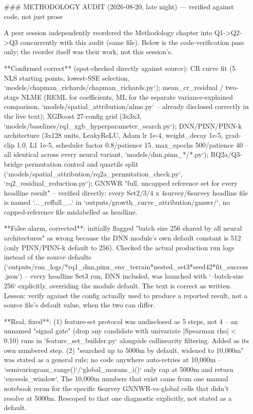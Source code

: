 ### METHODOLOGY AUDIT (2026-08-20, late night) — verified against code, not just prose

A peer session independently reordered the Methodology chapter into Q1->Q2->Q3 concurrently
with this audit (same file). Below is the code-verification pass only; the reorder itself was
their work, not this session's.

**Confirmed correct** (spot-checked directly against source): CR curve fit (5 NLS starting
points, lowest-SSE selection, `models/chapman_richards/chapman_richards.py`); mean_cr_residual /
two-stage NLME (REML for coefficients, ML for the separate variance-explained comparison,
`models/spatial_attribution/nlme.py` -- already disclosed correctly in the live text); XGBoost
27-config grid (3x3x3, `models/baselines/rq1_xgb_hyperparameter_search.py`); DNN/PINN/PINN-k
architecture (3x128 units, LeakyReLU, Adam lr 1e-4, weight_decay 1e-5, grad-clip 1.0, L1 1e-5,
scheduler factor 0.8/patience 15, max_epochs 500/patience 40 -- all identical across every neural
variant, `models/{dnn,pinn}_*/*.py`); RQ2a/Q3-bridge permutation control and quartile split
(`models/spatial_attribution/rq2a_permutation_check.py`, `rq2_residual_reduction.py`); GNNWR
"full, uncapped reference set for every headline result" -- verified directly: every Set2/3/4 x
4survey/6survey headline file is named `..._reffull_...` in
`outputs/growth_curve_attribution/gnnwr/`, no capped-reference file mislabelled as headline.

**False alarm, corrected**: initially flagged "batch size 256 shared by all neural architectures"
as wrong because the DNN module's own default constant is 512 (only PINN/PINN-k default to 256).
Checked the actual production run logs instead of the source defaults
(`outputs/run_logs/*rq1_{dnn,pinn}_env_terrain*nested_set3*seed42*fit_success.json`) -- every
headline Set3 run, DNN included, was launched with `--batch-size 256` explicitly, overriding the
module default. The text is correct as written. Lesson: verify against the config actually used
to produce a reported result, not a source file's default value, when the two can differ.

**Real, fixed**: (1) feature-set protocol was undisclosed as 5 steps, not 4 -- an unnamed
"signal gate" (drop any candidate with univariate |Spearman rho| < 0.10) runs in
`feature_set_builder.py` alongside collinearity filtering. Added as its own numbered step.
(2) "searched up to 5000m by default, widened to 10,000m" was stated as a general rule; no code
anywhere auto-retries at 10,000m -- `semivariogram_range()`/`global_morans_i()` only cap at
5000m and return `exceeds_window`. The 10,000m numbers that exist came from one manual notebook
rerun for the specific 6survey GNNWR-vs-global cells that didn't resolve at 5000m. Rescoped to
that one diagnostic explicitly, not stated as a default.

